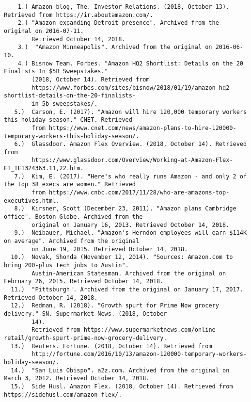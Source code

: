 \documentclass[]{article}
\begin{document}
\begin{verbatim}
    1.) Amazon blog, The. Investor Relations. (2018, October 13). Retrieved from https://ir.aboutamazon.com/.
    2.) "Amazon expanding Detroit presence". Archived from the original on 2016-07-11. 
        Retrieved October 14, 2018.
    3.)  "Amazon Minneapolis". Archived from the original on 2016-06-10. 
    4.) Bisnow Team. Forbes. "Amazon HQ2 Shortlist: Details on the 20 Finalists In $5B Sweepstakes." 
        (2018, October 14). Retrieved from 
        https://www.forbes.com/sites/bisnow/2018/01/19/amazon-hq2-shortlist-details-on-the-20-finalists-
        in-5b-sweepstakes/. 
   5.)  Carson, E. (2017). "Amazon will hire 120,000 temporary workers this holiday season." CNET. Retrieved 
        from https://www.cnet.com/news/amazon-plans-to-hire-120000-temporary-workers-this-holiday-season/. 
   6.)  Glassdoor. Amazon Flex Overview. (2018, October 14). Retrieved from 
        https://www.glassdoor.com/Overview/Working-at-Amazon-Flex-EI_IE1324363.11,22.htm.
   7.)  Kim, E. (2017). "Here's who really runs Amazon - and only 2 of the top 38 execs are women." Retrieved 
        from https://www.cnbc.com/2017/11/28/who-are-amazons-top-executives.html. 
   8.)  Kirsner, Scott (December 23, 2011). "Amazon plans Cambridge office". Boston Globe. Archived from the 
        original on January 16, 2013. Retrieved October 14, 2018. 
   9.)  Neibauer, Michael. "Amazon's Herndon employees will earn $114K on average". Archived from the original 
        on June 19, 2015. Retrieved October 14, 2018. 
  10.)  Novak, Shonda (November 12, 2014). "Sources: Amazon.com to bring 200-plus tech jobs to Austin". 
        Austin-American Statesman. Archived from the original on February 26, 2015. Retrieved October 14, 2018. 
  11.)  "Pittsburgh". Archived from the original on January 17, 2017. Retrieved October 14, 2018. 
  12.)  Redman, R. (2018). "Growth spurt for Prime Now grocery delivery." SN. Supermarket News. (2018, October 
        14). 
        Retrieved from https://www.supermarketnews.com/online-retail/growth-spurt-prime-now-grocery-delivery. 
  13.)  Reuters. Fortune. (2018, October 14). Retrieved from 
        http://fortune.com/2016/10/13/amazon-120000-temporary-workers-holiday-season/.
  14.)  "San Luis Obispo". a2z.com. Archived from the original on March 3, 2012. Retrieved October 14, 2018. 
  15.)  Side Husl. Amazon Flex. (2018, October 14). Retrieved from https://sidehusl.com/amazon-flex/. 
\end{verbatim}
\end{document}
